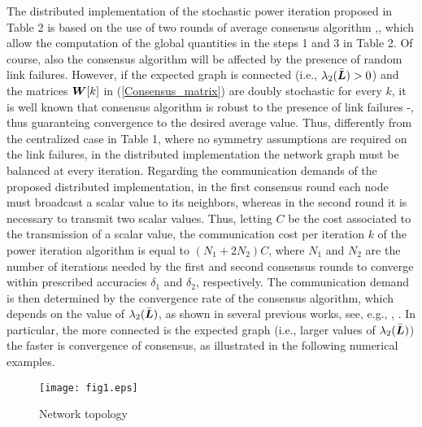\documentclass[10pt,twocolumn]{IEEEtran}
\def\bL{\mbox{\boldmath $L$}}
\def\bW{\mbox{\boldmath $W$}}
\begin{document}
 The distributed implementation of the stochastic power iteration proposed in Table 2 is based on the use of two rounds of average consensus algorithm \cite{Olfati1},\cite{Barb-Scut}, which allow the computation of the global quantities in the steps 1 and 3 in Table 2. Of course, also the consensus algorithm will be affected by the presence of random link failures.
However, if the expected graph is connected (i.e., $\lambda_2(\bar{\bL})>0$) and the matrices $\bW[k]$ in (\ref{Consensus_matrix}) are doubly stochastic for every $k$, it is well known that consensus algorithm is robust to the presence of link failures \cite{Tahbaz-Salehi-Jadb1}-\cite{Kar-Moura2}, thus guaranteing convergence to the desired average value. Thus, differently from the centralized case in Table 1, where no symmetry assumptions are required on the link failures, in the distributed implementation the network graph must be balanced at every iteration.
Regarding the communication demands of the proposed distributed implementation, in the first consensus round each node must broadcast a scalar value to its neighbors, whereas in the second round it is necessary to transmit two scalar values. Thus, letting $C$ be the cost associated to the transmission of a scalar value, the communication cost per iteration $k$ of the power iteration algorithm is equal to $(N_1+2N_2)C$, where $N_1$ and $N_2$ are the number of iterations needed by the first and second consensus rounds to converge within  prescribed accuracies $\delta_1$ and $\delta_2$, respectively. The communication demand is then determined by the convergence rate of the consensus algorithm, which depends on the value of $\lambda_2(\bar{\bL})$, as shown in several previous works, see, e.g., \cite{Kar-Moura}, \cite{Kar-Moura2}. In particular, the more connected is the expected graph (i.e., larger values of $\lambda_2(\bar{\bL})$) the faster is convergence of consensus, as illustrated in the following numerical examples.

\begin{figure}[t]
\centering
\texttt{[image: fig1.eps]}
  \caption{Network topology}\label{Net}
\end{figure}
\end{document}
